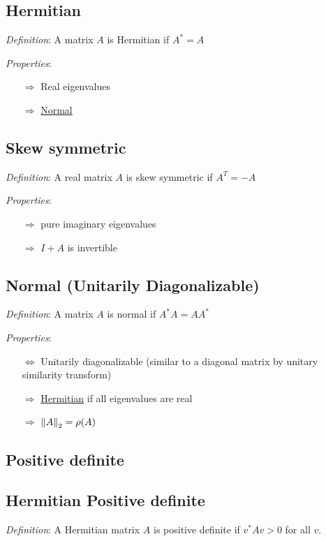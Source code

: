 \documentclass[12pt]{article}
\begin{document}
\subsection{Hermitian}
\label{sec:hermitian}
\textit{Definition}: A matrix \( A \) is Hermitian if \( A^* = A \)

\textit{Properties}:
\begin{itemize}[nolistsep]
    \item[\(\Rightarrow\)] Real eigenvalues
    \item[\(\Rightarrow\)] \hyperref[sec:normal]{Normal}
\end{itemize}


\subsection{Skew symmetric}
\textit{Definition}: A real matrix \( A \) is skew symmetric if \( A^T = -A \)

\textit{Properties}:
\begin{itemize}[nolistsep]
    \item[\(\Rightarrow\)] pure imaginary eigenvalues
    \item[\(\Rightarrow\)] \( I+A \) is invertible
\end{itemize}


\subsection{Normal (Unitarily Diagonalizable)}
\label{sec:normal}
\textit{Definition}: A matrix \( A \) is normal if \( A^*A = AA^* \)

\textit{Properties}:
\begin{itemize}[nolistsep]
    \item[\(\Leftrightarrow\)] Unitarily diagonalizable (similar to a diagonal matrix by unitary similarity transform)
    \item[\(\Rightarrow\)] \hyperref[sec:hermitian]{Hermitian} if all eigenvalues are real
    \item[\(\Rightarrow\)] \( \left\lVert A\right\rVert_2 = \rho(A) \)
\end{itemize}

\subsection{Positive definite}

\subsection{Hermitian Positive definite}
\textit{Definition}: A Hermitian matrix \( A \) is positive definite if \( v^*Av > 0 \) for all \( v \).
\end{document}
